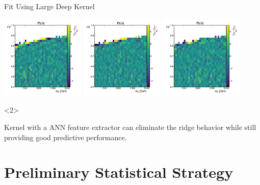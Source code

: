 \documentclass[10pt]{beamer}
\begin{document}
\begin{frame}{Fit Using Large Deep Kernel}
  \begin{center}
    \includegraphics[width=0.3\textwidth]{figures/2dpullplots/nnrbf_256_128_16/E_1500_0p5_150_0p07.pdf} 
    \includegraphics[width=0.3\textwidth]{figures/2dpullplots/nnrbf_256_128_16/E_2000_0p7_150_0p05.pdf} 
    \includegraphics[width=0.3\textwidth]{figures/2dpullplots/nnrbf_256_128_16/E_2000_0p5_150_0p07.pdf} 
  \end{center}

  \begin{onlyenv}<2>
    \begin{beamerpopover}
      \begin{block}{}
        Kernel with a ANN feature extractor can eliminate the ridge behavior while still providing good predictive performance.
      \end{block}
    \end{beamerpopover}
  \end{onlyenv}
\end{frame}


\section[Statistical Considerations]{Preliminary Statistical Strategy}
\end{document}
